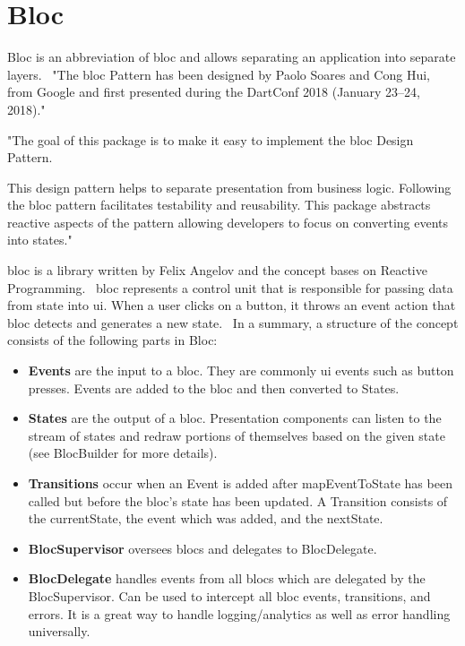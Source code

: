 \section{Bloc}\label{sec:bloc}
Bloc is an abbreviation of \acrfull{bloc} and allows separating an application into separate layers.~\cite{bloc}
"The \acrshort{bloc} Pattern has been designed by Paolo Soares and Cong Hui, from Google and first presented during the DartConf 2018 (January 23--24, 2018)."~\cite{didierboelens}

"The goal of this package is to make it easy to implement the \acrshort{bloc} Design Pattern.

This design pattern helps to separate presentation from business logic.
Following the \acrshort{bloc} pattern facilitates testability and reusability.
This package abstracts reactive aspects of the pattern allowing developers to focus on converting events into states."~\cite{bloc}

\acrshort{bloc} is a library written by Felix Angelov and the concept bases on Reactive Programming.~\cite{bloc}
\acrshort{bloc} represents a control unit that is responsible for passing data from state into \acrshort{ui}.
When a user clicks on a button, it throws an event action that \acrshort{bloc} detects and generates a new state.~\cite{bloc}
In a summary, a structure of the concept consists of the following parts in Bloc:
\begin{itemize}
    \item \textbf{Events} are the input to a \acrshort{bloc}.
    They are commonly \acrshort{ui} events such as button presses.
    Events are added to the \acrshort{bloc} and then converted to States.
    \item \textbf{States} are the output of a \acrshort{bloc}.
    Presentation components can listen to the stream of states and redraw portions of themselves based on the given state (see BlocBuilder for more details).
    \item \textbf{Transitions} occur when an Event is added after mapEventToState has been called but before the \acrshort{bloc}'s state has been updated.
    A Transition consists of the currentState, the event which was added, and the nextState.
    \item \textbf{BlocSupervisor} oversees \acrshort{bloc}s and delegates to BlocDelegate.
    \item \textbf{BlocDelegate} handles events from all \acrshort{bloc}s which are delegated by the BlocSupervisor.
    Can be used to intercept all \acrshort{bloc} events, transitions, and errors.
    It is a great way to handle logging/analytics as well as error handling universally.
\end{itemize}

